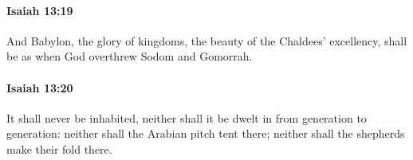 		\paragraph{Isaiah 13:19} %
			\label{ISAIAH-13-19}

			And Babylon, the glory of kingdoms, the beauty of the Chaldees' excellency, shall be as when God overthrew Sodom and Gomorrah.


		\paragraph{Isaiah 13:20} %
			\label{ISAIAH-13-20}

			It shall never be inhabited, neither shall it be dwelt in from generation to generation: neither shall the Arabian pitch tent there; neither shall the shepherds make their fold there.



